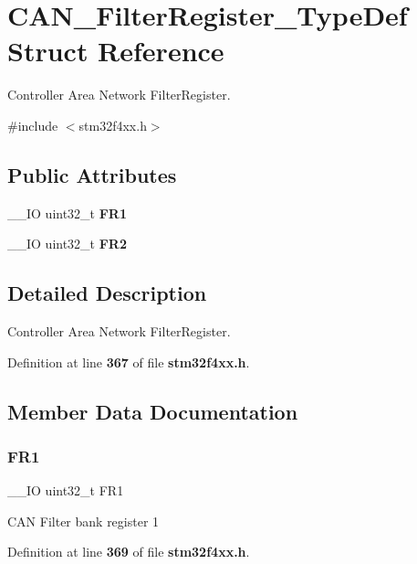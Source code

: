 \section{C\+A\+N\+\_\+\+Filter\+Register\+\_\+\+Type\+Def Struct Reference}
\label{structCAN__FilterRegister__TypeDef}


Controller Area Network Filter\+Register.  




{\ttfamily \#include $<$stm32f4xx.\+h$>$}

\subsection*{Public Attributes}
\begin{DoxyCompactItemize}
\item 
\+\_\+\+\_\+\+IO uint32\+\_\+t \textbf{ F\+R1}
\item 
\+\_\+\+\_\+\+IO uint32\+\_\+t \textbf{ F\+R2}
\end{DoxyCompactItemize}


\subsection{Detailed Description}
Controller Area Network Filter\+Register. 

Definition at line \textbf{ 367} of file \textbf{ stm32f4xx.\+h}.



\subsection{Member Data Documentation}
\mbox{\label{structCAN__FilterRegister__TypeDef_a92036953ac673803fe001d843fea508b}} 
\subsubsection{F\+R1}
{\footnotesize\ttfamily \+\_\+\+\_\+\+IO uint32\+\_\+t F\+R1}

C\+AN Filter bank register 1 

Definition at line \textbf{ 369} of file \textbf{ stm32f4xx.\+h}.

